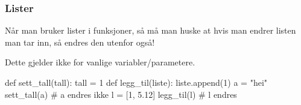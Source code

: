 \begin{frame}[fragile]
    \frametitle{Lister}

    Når man bruker lister i funksjoner, så må man huske at hvis man endrer listen man tar inn, så endres den utenfor også! 
    
    Dette gjelder ikke for vanlige variabler/parametere.

\begin{python}
def sett_tall(tall):
    tall = 1
def legg_til(liste):
    liste.append(1)
a = "hei"
sett_tall(a) # a endres ikke
l = [1, 5.12]
legg_til(l) # l endres
\end{python}

\end{frame}
